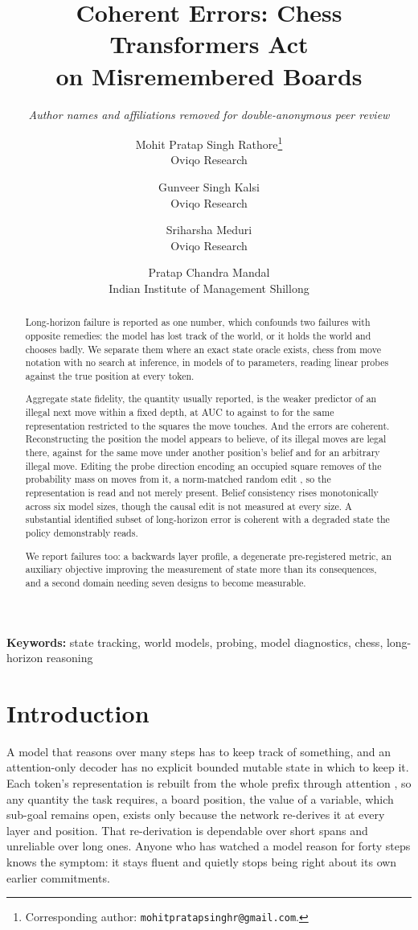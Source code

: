 \documentclass[11pt]{article}
\title{\bf Coherent Errors: Chess Transformers Act\\on Misremembered Boards}
\author{\normalsize\itshape Author names and affiliations removed for double-anonymous peer review}
\author{
    Mohit Pratap Singh Rathore\thanks{Corresponding author:
    \texttt{mohitpratapsinghr@gmail.com}.}\\ \small Oviqo Research
    \and
    Gunveer Singh Kalsi\\ \small Oviqo Research
    \and
    Sriharsha Meduri\\ \small Oviqo Research
    \and
    Pratap Chandra Mandal\\ \small Indian Institute of Management Shillong
  }
\date{}
\theoremstyle{remark}
\begin{document}
\maketitle

\begin{abstract}
Long-horizon failure is reported as one number, which confounds two failures with
opposite remedies: the model has lost track of the world, or it holds the world
and chooses badly. We separate them where an exact state oracle exists, chess
from move notation with no search at inference, in models of
 to  parameters, reading linear probes
against the true position at every token.

Aggregate state fidelity, the quantity usually reported, is the weaker predictor
of an illegal next move within a fixed depth, at AUC  to
 against  to  for the same
representation restricted to the squares the move touches. And the errors are
coherent. Reconstructing the position the model appears to believe,
 of its illegal moves are legal there, against
 for the same move under another position's belief and
 for an arbitrary illegal move. Editing the probe direction
encoding an occupied square removes  of the probability mass
on moves from it, a norm-matched random edit , so the
representation is read and not merely present. Belief consistency rises
monotonically across six model sizes, though the causal edit is not measured at
every size. A substantial identified subset of long-horizon error is coherent
with a degraded state the policy demonstrably reads.

We report failures too: a backwards layer profile, a degenerate pre-registered
metric, an auxiliary objective improving the measurement of state more than its
consequences, and a second domain needing seven designs to become measurable.
\end{abstract}

\noindent\textbf{Keywords:} state tracking, world models, probing, model
diagnostics, chess, long-horizon reasoning

\section{Introduction}

A model that reasons over many steps has to keep track of something, and an
attention-only decoder has no explicit bounded mutable state in which to keep it.
Each token's representation is rebuilt from the whole prefix through attention
\citep{vaswani2017attention}, so any quantity the task requires, a board
position, the value of a variable, which sub-goal remains open, exists only
because the network re-derives it at every layer and position. That re-derivation
is dependable over short spans and unreliable over long ones. Anyone who has
watched a model reason for forty steps knows the symptom: it stays fluent and
quietly stops being right about its own earlier commitments.
\end{document}
